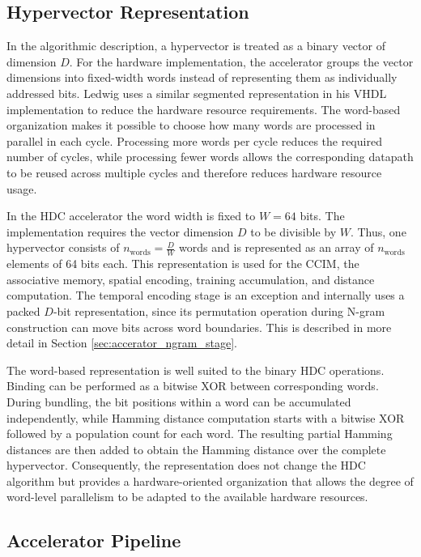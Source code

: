 \subsection{Hypervector Representation}
In the algorithmic description, a hypervector is treated as a binary vector of dimension $D$. For the hardware implementation, the accelerator groups the vector dimensions into fixed-width words instead of representing them as individually addressed bits. Ledwig \cite{ledwig_vdl-implementierung_2025} uses a similar segmented representation in his VHDL implementation to reduce the hardware resource requirements. The word-based organization makes it possible to choose how many words are processed in parallel in each cycle. Processing more words per cycle reduces the required number of cycles, while processing fewer words allows the corresponding datapath to be reused across multiple cycles and therefore reduces hardware resource usage.


In the HDC accelerator the word width is fixed to $W = 64$ bits. The implementation requires the vector dimension $D$ to be divisible by $W$. Thus, one hypervector consists of $n_{\mathrm{words}} = \frac{D}{W}$ words and is represented as an array of $n_{\mathrm{words}}$ elements of 64 bits each. This representation is used for the CCIM, the associative memory, spatial encoding, training accumulation, and distance computation. The temporal encoding stage is an exception and internally uses a packed $D$-bit representation, since its permutation operation during N-gram construction can move bits across word boundaries. This is described in more detail in Section \ref{sec:accerator_ngram_stage}.

The word-based representation is well suited to the binary HDC operations. Binding can be performed as a bitwise XOR between corresponding words. During bundling, the bit positions within a word can be accumulated independently, while Hamming distance computation starts with a bitwise XOR followed by a population count for each word. The resulting partial Hamming distances are then added to obtain the Hamming distance over the complete hypervector.
Consequently, the representation does not change the HDC algorithm but provides a hardware-oriented organization that allows the degree of word-level parallelism to be adapted to the available hardware resources.

\subsection{Accelerator Pipeline}
\label{sec:accelerator_pipeline}

